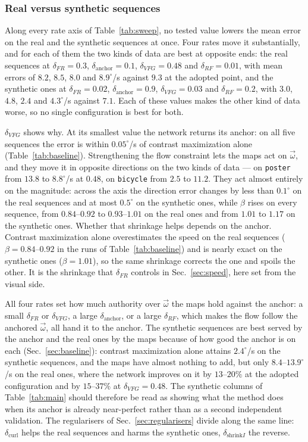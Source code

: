 \documentclass[journal]{IEEEtran}
\newcommand{\wvec}{\vec{\omega}}
\begin{document}
\subsubsection{Real versus synthetic sequences}
\label{sec:realvssynth}
Along every rate axis of Table~\ref{tab:sweep}, no tested value lowers the
mean error on the real and the synthetic sequences at once. Four rates move it
substantially, and for each of them the two kinds of data are best at opposite
ends: the real sequences at $\delta_{F\!R} = 0.3$,
$\delta_{\text{anchor}} = 0.1$, $\delta_{V\!F\!G} = 0.48$ and
$\delta_{R\!F} = 0.01$, with mean errors of $8.2$, $8.5$, $8.0$ and
$8.9^\circ$/s against $9.3$ at the adopted point, and the synthetic ones at
$\delta_{F\!R} = 0.02$, $\delta_{\text{anchor}} = 0.9$,
$\delta_{V\!F\!G} = 0.03$ and $\delta_{R\!F} = 0.2$, with $3.0$, $4.8$, $2.4$
and $4.3^\circ$/s against $7.1$. Each of these values makes the other kind of
data worse, so no single configuration is best for both.

$\delta_{V\!F\!G}$ shows why. At its smallest value the network returns its
anchor: on all five sequences the error is within $0.05^\circ$/s of contrast
maximization alone (Table~\ref{tab:baseline}). Strengthening the flow
constraint lets the maps act on $\wvec$, and they move it in opposite
directions on the two kinds of data --- on \texttt{poster} from $13.8$ to
$8.8^\circ$/s at $0.48$, on \texttt{bicycle} from $2.5$ to $11.2$. They act
almost entirely on the magnitude: across the axis the direction error changes
by less than $0.1^\circ$ on the real sequences and at most $0.5^\circ$ on the
synthetic ones, while $\beta$ rises on every sequence, from $0.84$--$0.92$ to
$0.93$--$1.01$ on the real ones and from $1.01$ to $1.17$ on the synthetic
ones. Whether that shrinkage helps depends on the anchor. Contrast
maximization alone overestimates the speed on the real sequences
($\beta = 0.84$--$0.92$ in the runs of Table~\ref{tab:baseline}) and is nearly
exact on the synthetic ones ($\beta = 1.01$), so the same shrinkage corrects
the one and spoils the other. It is the shrinkage that $\delta_{F\!R}$ controls
in Sec.~\ref{sec:speed}, here set from the visual side.

All four rates set how much authority over $\wvec$ the maps hold against the
anchor: a small $\delta_{F\!R}$ or $\delta_{V\!F\!G}$, a large
$\delta_{\text{anchor}}$, or a large $\delta_{R\!F}$, which makes the flow
follow the anchored $\wvec$, all hand it to the anchor. The synthetic sequences
are best served by the anchor and the real ones by the maps because of how
good the anchor is on each (Sec.~\ref{sec:baseline}): contrast maximization
alone attains $2.4^\circ$/s on the synthetic sequences, and the maps have
almost nothing to add, but only $8.4$--$13.9^\circ$/s on the real ones, where
the network improves on it by $13$--$20\%$ at the adopted configuration and by
$15$--$37\%$ at $\delta_{V\!F\!G} = 0.48$. The synthetic columns of
Table~\ref{tab:main} should therefore be read as showing what the method does
when its anchor is already near-perfect rather than as a second independent
validation. The regularisers of Sec.~\ref{sec:regularisers} divide along the
same line: $\delta_{\text{curl}}$ helps the real sequences and harms the
synthetic ones, $\delta_{\text{shrink}I}$ the reverse.
\end{document}
